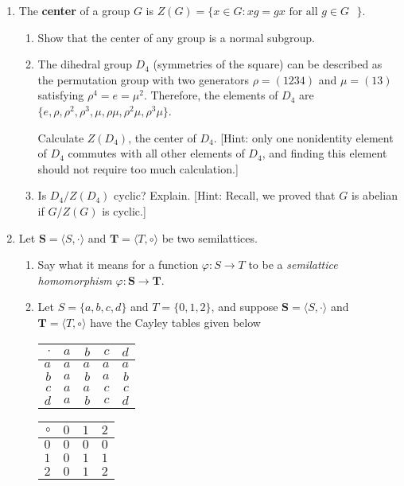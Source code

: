 \documentclass[fleqn,12pt]{article}
\newcommand{\<}{\ensuremath{\langle}}
\renewcommand{\>}{\ensuremath{\rangle}}
\newcommand{\bS}{\ensuremath{\mathbf{S}}}
\newcommand{\bT}{\ensuremath{\mathbf{T}}}
\begin{document}
\begin{enumerate}[{\bf 1.}]
\newpage

\item The {\bf center} of a group $G$ is
$Z(G) = \{ x \in G : xg = gx \text{ for all $g \in G$ }\}$.

\begin{enumerate}
 \item
Show that the center of any group is a normal subgroup.
 \vskip7cm

\item
The dihedral group $D_4$ (symmetries of the square) can be
described as the permutation group with two generators 
$\rho = (1234)$ and $\mu = (13)$ satisfying $\rho^4= e = \mu^2$.
Therefore, the elements of $D_4$ are 
$\{e, \rho, \rho^2, \rho^3, \mu, \rho \mu, \rho^2 \mu, \rho^3 \mu\}$.

Calculate $Z(D_4)$, the center of $D_4$. [Hint: only one nonidentity
element of $D_4$ commutes with all other elements of $D_4$, and finding
this element should not require too much calculation.]
 
 \vskip7cm

 
 \item
Is $D_4/Z(D_4)$ cyclic?  Explain. [Hint: Recall, we proved that 
$G$ is abelian if $G/Z(G)$ is cyclic.]
\end{enumerate}
\newpage

\item Let $\bS = \<S, \cdot\>$ and $\bT = \<T, \circ\>$ be two semilattices.
  \begin{enumerate}
  \item Say what it means for a function $\varphi: S \rightarrow T$ to be a
    \emph{semilattice homomorphism} $\varphi: \bS \rightarrow \bT$.
\vskip3cm
\item Let $S = \{a, b, c, d\}$ and $T = \{0, 1, 2\}$, and suppose 
  $\bS = \<S, \cdot\>$ and
  $\bT= \<T, \circ\>$ have the Cayley tables given below

\medskip
\begin{center}
\begin{tabular}{r|rrrr}
  $\cdot$ & $a$ &$b$&$c$&$d $\\
\hline
  $a$ & $a$ &$a$&$a$&$a$\\
  $b$ & $a$ &$b$&$a$&$b$\\
  $c$ & $a$ &$a$&$c$&$c$\\
  $d$ & $a$ &$b$&$c$&$d$
\end{tabular}
\hskip2cm
\begin{tabular}{r|rrr}
  $\circ$ & $0$ &$1$&$2$\\
\hline
  $0$ & $0$ &$0$&$0$\\
  $1$ & $0$ &$1$&$1$\\
  $2$ & $0$ &$1$&$2$
\end{tabular}
\end{center}


\end{enumerate}
\end{enumerate}
\end{document}
